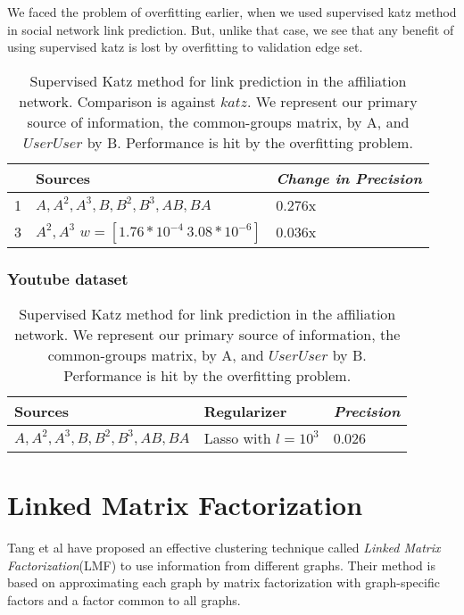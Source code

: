 \documentclass{report}
\begin{document}
We faced the problem of overfitting earlier, when we used supervised katz method in social network link prediction. But, unlike that case, we see that any benefit of using supervised katz is lost by overfitting to validation edge set.

\begin{table}
\centering
\begin{tabular}{|l|p{5cm} |  p{2cm}|}
\hline
 & Sources & \textit{Change in Precision}\\[1ex]
\hline
1 & $A, A^2, A^3, B, B^2, B^3, AB, BA$ & 0.276x\\
\hline
3 & $A^{2}, A^{3}$ $w = [1.76*10^{-4}\ 3.08*10^{-6}]$& 0.036x\\
\hline
\end{tabular}
\caption{Supervised Katz method for link prediction in the affiliation network. Comparison is against $katz$. We represent our primary source of information, the common-groups matrix, by A, and $UserUser$ by B. Performance is hit by the overfitting problem.}
\label{tab:supervisedAff}
\end{table}

\subsubsection{Youtube dataset}
\begin{table}
\centering
\begin{tabular}{|l|p{5cm} |  p{2cm}|}
\hline
Sources & Regularizer & \textit{Precision}\\[1ex]
\hline
$A, A^2, A^3, B, B^2, B^3, AB, BA$ & Lasso with $l = 10^3$& 0.026\\
\hline
\end{tabular}
\caption{Supervised Katz method for link prediction in the affiliation network. We represent our primary source of information, the common-groups matrix, by A, and $UserUser$ by B. Performance is hit by the overfitting problem.}
\label{tab:supervisedAff}
\end{table}


\section{Linked Matrix Factorization}
Tang et al have proposed an effective clustering technique called \textit{Linked Matrix Factorization}\cite{tangLMF}(LMF) to use information from different graphs. Their method is based on approximating each graph by matrix factorization with graph-specific factors and a factor common to all graphs. 
\end{document}
